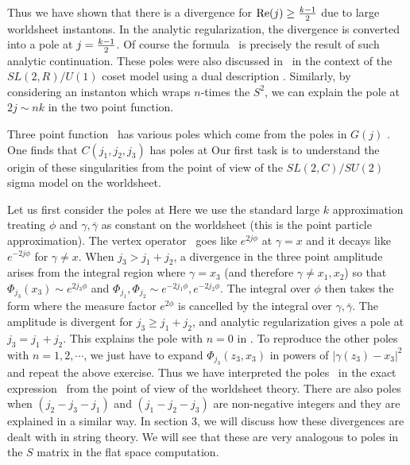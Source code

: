 Thus we have shown that there is a divergence for
${\rm Re}(j) \geq  {k-1\over 2}$ due to  large
worldsheet instantons.
In the analytic regularization, the divergence is converted into
a pole at $j =  {k-1\over 2}$. Of course
the formula \teschnertwo\ is precisely the result of such
analytic continuation.
These poles were also discussed in \gklast\ in
the context of the $SL(2,R)/U(1)$ coset
model using a dual
description \zam .
Similarly, by considering an instanton which wraps $n$-times
the $S^2$, we can explain the pole at $2j \sim nk$ in
the two point function.










Three point function \teschnerthree\
has various poles which come from the poles in $G(j)$ \gpolesfirst .
One finds that $C(j_1,j_2,j_3)$ has poles at
\eqn{}
Our first task is to understand the origin of these singularities
from the point of view of the $SL(2,C)/SU(2)$ sigma model
on the worldsheet.

Let us first consider the poles at
\eqn{}
Here we use the standard large $k$ approximation treating $\phi$ and
$\gamma , \bar \gamma$ as constant on the worldsheet (this is the point
particle approximation).
The vertex operator \operators\ goes like $e^{ 2 j \phi}$
at $\gamma = x$ and
it decays like $e^{-2j \phi}$ for $\gamma \not = x$.
When $j_3 > j_1+j_2$, a divergence in the
three point amplitude arises from the integral region
where $\gamma = x_3$ (and therefore $\gamma \neq x_1, x_2$)
so that $\Phi_{j_3}(x_3) \sim e^{2j_3\phi}$
and $\Phi_{j_1}, \Phi_{j_2} \sim e^{-2j_1\phi}, e^{-2j_2\phi}$.
The integral over $\phi$ then takes the form
\eqn{}
where the measure factor $e^{2\phi}$ is cancelled by the
integral over $\gamma, \bar{\gamma}$.
The amplitude is divergent for $j_3\geq j_1+j_2$,
and  analytic regularization gives a  pole at
$j_3 = j_1 + j_2$. This explains the pole with $n=0$
in \morepoles.
To reproduce the other poles with $n=1,2,\cdots$,
we just have to expand $\Phi_{j_3}(z_3,x_3)$
in powers of $|\gamma(z_3)-x_3|^2$ and repeat the above
exercise. Thus we have interpreted the poles \morepoles\
in the exact expression \threecoeff\ from the point of
view of the worldsheet theory.
There are also poles when $(j_2-j_3-j_1)$
and $(j_1-j_2-j_3)$ are non-negative integers
and they are explained in a similar way.
In section 3, we will discuss how these divergences
are dealt with in string theory.
We will see that these are very analogous to poles in the $S$ matrix
in the flat space computation.


